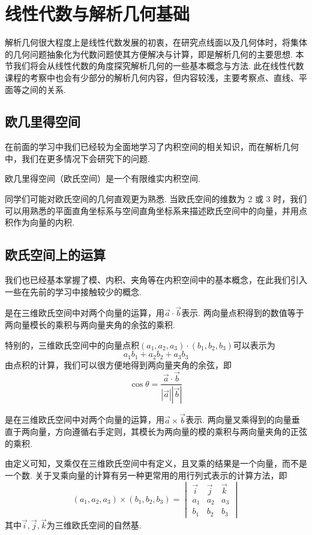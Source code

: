 \chapter{线性代数与解析几何基础}

解析几何很大程度上是线性代数发展的初衷，在研究点线面以及几何体时，将集体的几何问题抽象化为代数问题使其方便解决与计算，即是解析几何的主要思想. 本节我们将会从线性代数的角度探究解析几何的一些基本概念与方法. 此在线性代数课程的考察中也会有少部分的解析几何内容，但内容较浅，主要考察点、直线、平面等之间的关系.

\section{欧几里得空间}

在前面的学习中我们已经较为全面地学习了内积空间的相关知识，而在解析几何中，我们在更多情况下会研究下的问题.
\begin{definition}[欧几里得空间]
    欧几里得空间（欧氏空间）是一个有限维实内积空间.
\end{definition}
同学们可能对欧氏空间的几何直观更为熟悉. 当欧氏空间的维数为 2 或 3 时，我们可以用熟悉的平面直角坐标系与空间直角坐标系来描述欧氏空间中的向量，并用点积作为向量的内积.

\section{欧氏空间上的运算}

我们也已经基本掌握了模、内积、夹角等在内积空间中的基本概念，在此我们引入一些在先前的学习中接触较少的概念.
\begin{definition}[点积] 
    是在三维欧氏空间中对两个向量的运算，用$\vec{a}\cdot\vec{b}$表示. 两向量点积得到的数值等于两向量模长的乘积与两向量夹角的余弦的乘积.
\end{definition}
特别的，三维欧氏空间中的向量点积$(a_1,a_2,a_3)\cdot(b_1,b_2,b_3)$可以表示为\[a_1b_1+a_2b_2+a_3b_3\]
由点积的计算，我们可以很方便地得到两向量夹角的余弦，即\[\cos\theta=\frac{\vec{a}\cdot\vec{b}}{|\vec{a}||\vec{b}|}\]
\begin{definition}[叉乘] 
    是在三维欧氏空间中对两个向量的运算，用$\vec{a}\times\vec{b}$表示. 两向量叉乘得到的向量垂直于两向量，方向遵循右手定则，其模长为两向量的模的乘积与两向量夹角的正弦的乘积.
\end{definition}
由定义可知，叉乘仅在三维欧氏空间中有定义，且叉乘的结果是一个向量，而不是一个数. 关于叉乘向量的计算有另一种更常用的用行列式表示的计算方法，即
\[(a_1,a_2,a_3)\times(b_1,b_2,b_3)=\begin{vmatrix}
        \vec{i} & \vec{j} & \vec{k} \\
        a_1     & a_2     & a_3     \\
        b_1     & b_2     & b_3
    \end{vmatrix}\]
其中$\vec{i},\vec{j},\vec{k}$为三维欧氏空间的自然基.

